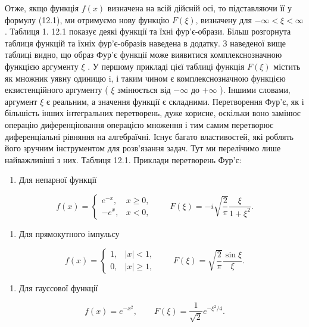 \documentclass[
  ukrainian,
]{article}
\providecommand{\tightlist}{%
  \setlength{\itemsep}{0pt}\setlength{\parskip}{0pt}}
\begin{document}
Отже, якщо функція \(f(x)\) визначена на всій дійсній осі, то
підставляючи її у формулу (12.1), ми отримуємо нову функцію \(F(\xi)\),
визначену для \(-\infty < \xi < \infty\). Таблиця 1. 12.1 показує деякі
функції та їхні фур'є-образи. Більш розгорнута таблиця функцій та їхніх
фур'є-образів наведена в додатку. З наведеної вище таблиці видно, що
образ Фур'є функції може виявитися комплекснозначною функцією аргументу
\(\xi\) . У першому прикладі цієї таблиці функція \(F(\xi)\) містить як
множник уявну одиницю i, і таким чином є комплекснозначною функцією
екзистенційного аргументу ( \(\xi\) змінюється від \(-\infty\) до
\(+\infty\) ). Іншими словами, аргумент \(\xi\) є реальним, а значення
функції є складними. Перетворення Фур'є, як і більшість інших
інтегральних перетворень, дуже корисне, оскільки воно замінює операцію
диференціювання операцією множення і тим самим перетворює диференціальні
рівняння на алгебраїчні. Існує багато властивостей, які роблять його
зручним інструментом для розв'язання задач. Тут ми перелічимо лише
найважливіші з них. Таблиця 12.1. Приклади перетворень Фур'є:

\begin{enumerate}
\def\labelenumi{\arabic{enumi}.}
\tightlist
\item
  Для непарної функції
\end{enumerate}

\[
f(x)=
\begin{cases}
e^{-x}, & x\ge 0,\\
-e^{x}, & x<0,
\end{cases}
\qquad F(\xi)=-i\sqrt{\frac{2}{\pi}}\frac{\xi}{1+\xi^2}.
\]

\begin{enumerate}
\def\labelenumi{\arabic{enumi}.}
\setcounter{enumi}{1}
\tightlist
\item
  Для прямокутного імпульсу
\end{enumerate}

\[
f(x)=
\begin{cases}
1, & |x|<1,\\
0, & |x|\ge 1,
\end{cases}
\qquad F(\xi)=\sqrt{\frac{2}{\pi}}\frac{\sin\xi}{\xi}.
\]

\begin{enumerate}
\def\labelenumi{\arabic{enumi}.}
\setcounter{enumi}{2}
\tightlist
\item
  Для гауссової функції
\end{enumerate}

\[
f(x)=e^{-x^2},
\qquad F(\xi)=\frac{1}{\sqrt{2}}e^{-\xi^2/4}.
\]
\end{document}
